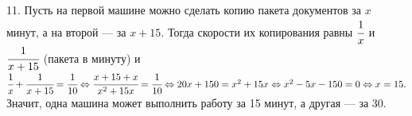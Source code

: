 11. Пусть на первой машине можно сделать копию пакета документов за $x$ минут, а на второй --- за $x+15.$ Тогда скорости их копирования равны $\cfrac{1}{x}$ и
$\cfrac{1}{x+15}$ (пакета в минуту) и $\cfrac{1}{x}+\cfrac{1}{x+15}=\cfrac{1}{10}\Leftrightarrow\cfrac{x+15+x}{x^2+15x}=\cfrac{1}{10}\Leftrightarrow
20x+150=x^2+15x\Leftrightarrow x^2-5x-150=0\Leftrightarrow x=15.$ Значит, одна машина может выполнить работу за 15 минут, а другая --- за 30.\\
